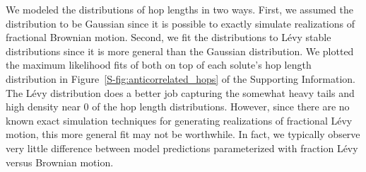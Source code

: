 \documentclass[journal=jctcce,manuscript=article]{achemso}
\begin{document}
  
  We modeled the distributions of hop lengths in two ways. First, we assumed
  the distribution to be Gaussian since it is possible to exactly simulate
  realizations of fractional Brownian motion. Second, we fit the distributions
  to L\'evy stable distributions since it is more general than the Gaussian
  distribution. We plotted the maximum likelihood fits of both on top of each
  solute's hop length distribution in Figure~\ref{S-fig:anticorrelated_hops} of the
  Supporting Information. The L\'evy distribution does a better job capturing
  the somewhat heavy tails and high density near 0 of the hop length distributions. 
  However, since there are no known exact simulation techniques for generating 
  realizations of fractional L\'evy motion, this more general fit may not be 
  worthwhile. In fact, we typically observe very little difference between model
  predictions parameterized with fraction L\'evy versus Brownian motion.%
\end{document}
